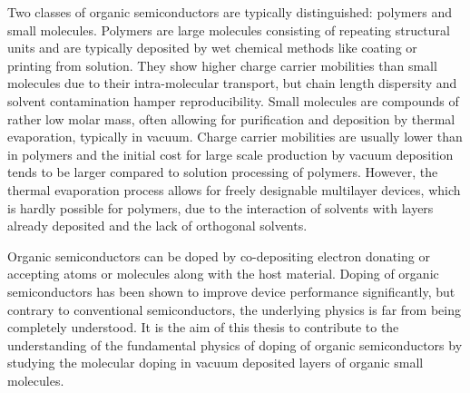 Two classes of organic semiconductors are typically distinguished: polymers and small molecules.
Polymers are large molecules consisting of repeating structural units and are typically deposited by wet chemical methods like coating or printing from solution. They show higher charge carrier mobilities than small molecules due to their intra-molecular transport, but chain length dispersity and solvent contamination hamper reproducibility.
Small molecules are compounds of rather low molar mass, often allowing for purification and deposition by thermal evaporation, typically in vacuum. Charge carrier mobilities are usually lower than in polymers and the initial cost for large scale production by vacuum deposition tends to be larger compared to solution processing of polymers. However, the thermal evaporation process allows for freely designable multilayer devices, which is hardly possible for polymers, due to the interaction of solvents with layers already deposited and the lack of orthogonal solvents.

Organic semiconductors can be doped by co-depositing electron donating or accepting atoms or molecules along with the host material. Doping of organic semiconductors has been shown to improve device performance significantly\cite{Walzer2007,LuessemRiedeLeo2013-PSS}, but contrary to conventional semiconductors, the underlying physics is far from being completely understood.
It is the aim of this thesis to contribute to the understanding of the fundamental physics of doping of organic semiconductors by studying the molecular doping in vacuum deposited layers of organic small molecules.

